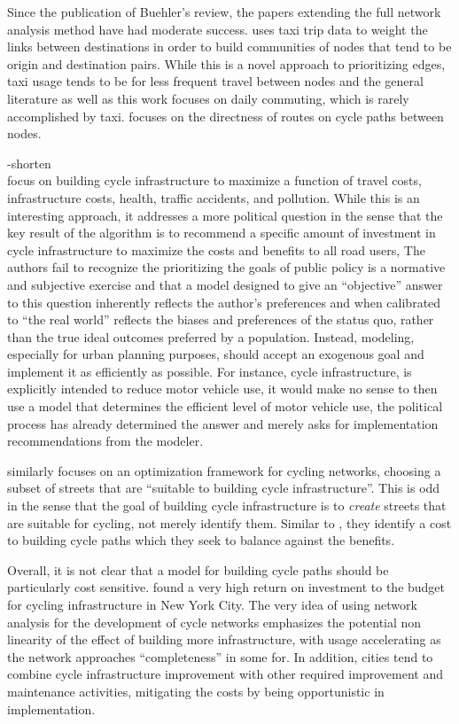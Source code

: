 Since the publication of Buehler's review, the papers extending the full network analysis method have had moderate success. \cite{akbarzadeh2018designing} uses taxi trip data to weight the links between destinations in order to build communities of nodes that tend to be origin and destination pairs. While this is a novel approach to prioritizing edges, taxi usage tends to be for less frequent travel between nodes and the general literature as well as this work focuses on daily commuting, which is rarely accomplished by taxi. \cite{boisjoly2019bicycle} focuses on the directness of routes on cycle paths between nodes. 

-shorten \\
\cite{doorley2019designing} focus on building cycle infrastructure to maximize a function of travel costs, infrastructure costs, health, traffic accidents, and pollution. While this is an interesting approach, it addresses a more political question in the sense that the key result of the algorithm is to recommend a specific amount of investment in cycle infrastructure to maximize the costs and benefits to all road users, The authors fail to recognize the prioritizing the goals of public policy is a normative and subjective exercise and that a model designed to give an ``objective'' answer to this question inherently reflects the author's preferences and when calibrated to ``the real world'' reflects the biases and preferences of the status quo, rather than the true ideal outcomes preferred by a population. Instead, modeling, especially for urban planning purposes, should accept an exogenous goal and implement it as efficiently as possible. For instance, cycle infrastructure, is explicitly intended to reduce motor vehicle use, it would make no sense to then use a model that determines the efficient level of motor vehicle use, the political process has already determined the answer and merely asks for implementation recommendations from the modeler. 

\cite{mauttone2017bicycle} similarly focuses on an optimization framework for cycling networks, choosing a subset of streets that are ``suitable to building cycle infrastructure''. This is odd in the sense that the goal of building cycle infrastructure is to \textit{create} streets that are suitable for cycling, not merely identify them. Similar to \cite{doorley2019designing}, they identify a cost to building cycle paths which they seek to balance against the benefits. 

Overall, it is not clear that a model for building cycle paths should be particularly cost sensitive. \cite{gu2017cost} found a very high return on investment to the budget for cycling infrastructure in New York City. The very idea of using network analysis for the development of cycle networks emphasizes the potential non linearity of the effect of building more infrastructure, with usage accelerating as the network approaches ``completeness'' in some for. In addition, cities tend to combine cycle infrastructure improvement with other required improvement and maintenance activities, mitigating the costs by being opportunistic in implementation. 

